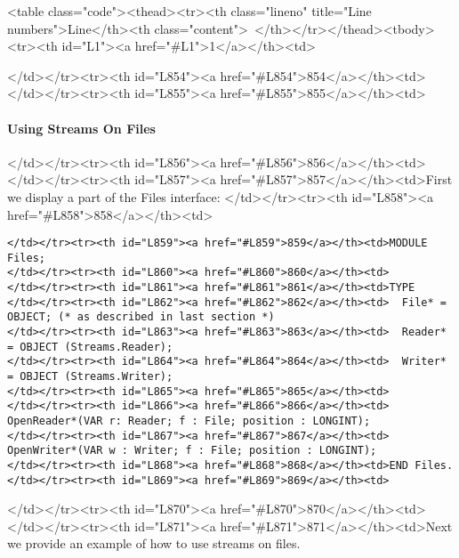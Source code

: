 <table class="code"><thead><tr><th class="lineno" title="Line numbers">Line</th><th class="content"> </th></tr></thead><tbody><tr><th id="L1"><a href="#L1">1</a></th><td>\documentclass[a4paper,11pt]{article}
\begin{document}
</td></tr><tr><th id="L854"><a href="#L854">854</a></th><td>
</td></tr><tr><th id="L855"><a href="#L855">855</a></th><td>\paragraph{Using Streams On Files}
</td></tr><tr><th id="L856"><a href="#L856">856</a></th><td>
</td></tr><tr><th id="L857"><a href="#L857">857</a></th><td>First we display a part of the Files interface:
</td></tr><tr><th id="L858"><a href="#L858">858</a></th><td>\begin{lstlisting}[language=Oberon,frame=none,caption={Using Streams On Files}]
</td></tr><tr><th id="L859"><a href="#L859">859</a></th><td>MODULE Files;
</td></tr><tr><th id="L860"><a href="#L860">860</a></th><td>
</td></tr><tr><th id="L861"><a href="#L861">861</a></th><td>TYPE
</td></tr><tr><th id="L862"><a href="#L862">862</a></th><td>  File* = OBJECT; (* as described in last section *)
</td></tr><tr><th id="L863"><a href="#L863">863</a></th><td>  Reader* = OBJECT (Streams.Reader);
</td></tr><tr><th id="L864"><a href="#L864">864</a></th><td>  Writer* = OBJECT (Streams.Writer);
</td></tr><tr><th id="L865"><a href="#L865">865</a></th><td>
</td></tr><tr><th id="L866"><a href="#L866">866</a></th><td>  OpenReader*(VAR r: Reader; f : File; position : LONGINT);
</td></tr><tr><th id="L867"><a href="#L867">867</a></th><td>  OpenWriter*(VAR w : Writer; f : File; position : LONGINT);
</td></tr><tr><th id="L868"><a href="#L868">868</a></th><td>END Files.
</td></tr><tr><th id="L869"><a href="#L869">869</a></th><td>\end{lstlisting}
</td></tr><tr><th id="L870"><a href="#L870">870</a></th><td>
</td></tr><tr><th id="L871"><a href="#L871">871</a></th><td>Next we provide an example of how to use streams on files.
\end{document}
